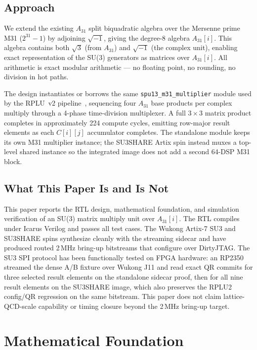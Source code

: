 \documentclass[conference]{IEEEtran}
\begin{document}
\subsection{Approach}

We extend the existing $A_{31}$ split biquadratic algebra over the Mersenne
prime M31 ($2^{31}-1$) by adjoining $\sqrt{-1}$, giving the degree-8 algebra
$A_{31}[i]$. This algebra contains both $\sqrt{3}$ (from $A_{31}$) and
$\sqrt{-1}$ (the complex unit), enabling exact representation of the SU(3)
generators as matrices over $A_{31}[i]$. All arithmetic is exact modular
arithmetic --- no floating point, no rounding, no division in hot paths.

The design instantiates or borrows the same \texttt{spu13\_m31\_multiplier}
module used by the RPLU~v2 pipeline~\cite{rplu2026}, sequencing four
$A_{31}$ base products per complex multiply through a 4-phase time-division
multiplexer. A full $3\times3$ matrix product completes in approximately 224
compute cycles, emitting row-major result elements as each $C[i][j]$
accumulator completes. The standalone module keeps its own M31 multiplier
instance; the SU3SHARE Artix spin instead muxes a top-level shared instance
so the integrated image does not add a second 64-DSP M31 block.

\subsection{What This Paper Is and Is Not}

This paper reports the RTL design, mathematical foundation, and simulation
verification of an SU(3) matrix multiply unit over $A_{31}[i]$. The RTL
compiles under Icarus Verilog and passes all test cases. The Wukong Artix-7
SU3 and SU3SHARE spins synthesize cleanly with the streaming sidecar and
have produced routed 2\,MHz bring-up bitstreams that configure over
DirtyJTAG. The SU3 SPI protocol has been functionally tested on FPGA
hardware: an RP2350 streamed the dense A/B fixture over Wukong J11 and read
exact QR commits for three selected result elements on the standalone
sidecar proof, then for all nine result elements on the SU3SHARE image,
which also preserves the RPLU2 config/QR regression on the same bitstream.
This paper does not claim lattice-QCD-scale capability or timing closure
beyond the 2\,MHz bring-up target.

\section{Mathematical Foundation}
\end{document}
